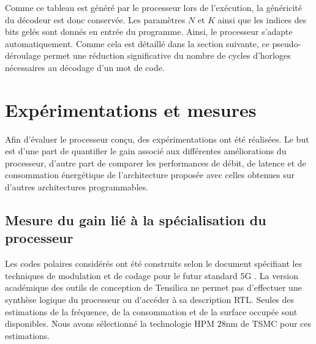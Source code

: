 Comme ce tableau est généré par le processeur lors de l'exécution, la généricité du décodeur est donc conservée. Les paramètres $N$ et $K$ ainsi que les indices des bits gelés sont donnés en entrée du programme. Ainsi, le processeur s'adapte automatiquement. Comme cela est détaillé dans la section suivante, ce pseudo-déroulage permet une réduction significative du nombre de cycles d'horloges nécessaires au décodage d'un mot de code.


\section{Expérimentations et mesures}
\label{sec:tensilica_res}
Afin d'évaluer le processeur conçu, des expérimentations ont été réalisées. Le but est d'une part de quantifier le gain associé aux différentes améliorations du processeur, d'autre part de comparer les performances de débit, de latence et de consommation énergétique de l'architecture proposée avec celles obtenues sur d'autres architectures programmables.
\subsection{Mesure du gain lié à la spécialisation du processeur}

Les codes polaires considérés ont été construits selon le document spécifiant les techniques de modulation et de codage pour le futur standard 5G \cite{3gpp_ts_2017-1}. 
La version académique des outils de conception de Tensilica ne permet pas d'effectuer une synthèse logique du processeur ou d'accéder à sa description RTL. Seules des estimations de la fréquence, de la consommation et de la surface occupée sont disponibles. Nous avons sélectionné la technologie HPM 28nm de TSMC pour ces estimations.

